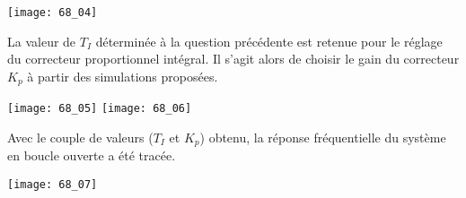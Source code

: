 \begin{marginfigure}
\texttt{[image: 68\_04]}
\end{marginfigure}
\fi

\ifprof
\else 
\fi


\ifprof
\else 
La valeur de $T_I$ déterminée à la question précédente est retenue pour le réglage du correcteur proportionnel intégral.
Il s’agit alors de choisir le gain du correcteur $K_p$ à partir des simulations proposées.

\begin{marginfigure}
\texttt{[image: 68\_05]}
\texttt{[image: 68\_06]}
\end{marginfigure}
\fi

\ifprof
\else 
\fi

\ifprof
\else 

Avec le couple de valeurs ($T_I$ et $K_p$) obtenu, la réponse fréquentielle du système en boucle ouverte a été tracée.
\begin{marginfigure}
\texttt{[image: 68\_07]}
\end{marginfigure}
\fi


\ifprof
\else 
\fi


\ifprof
\else
{}
\fi